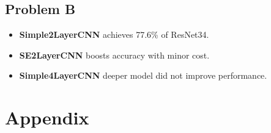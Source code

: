 \documentclass[12pt]{article}
\begin{document}
\subsection*{Problem B}
\begin{itemize}[noitemsep]
    \item \textbf{Simple2LayerCNN} achieves 77.6\% of ResNet34.
    \item \textbf{SE2LayerCNN} boosts accuracy with minor cost.
    \item \textbf{Simple4LayerCNN} deeper model did not improve performance.
\end{itemize}

\section*{Appendix}
\end{document}
